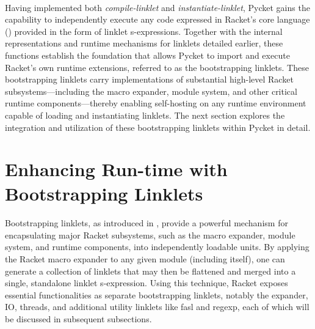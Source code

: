 		\paragraph{}%
			Having implemented both \emph{compile-linklet} and \emph{instantiate-linklet}, Pycket gains the capability to independently execute any code expressed in Racket's core language () provided in the form of linklet s-expressions. Together with the internal representations and runtime mechanisms for linklets detailed earlier, these functions establish the foundation that allows Pycket to import and execute Racket’s own runtime extensions, referred to as the bootstrapping linklets. These bootstrapping linklets carry implementations of substantial high-level Racket subsystems—including the macro expander, module system, and other critical runtime components—thereby enabling self-hosting on any runtime environment capable of loading and instantiating linklets. The next section explores the integration and utilization of these bootstrapping linklets within Pycket in detail.

	\section[\texorpdfstring{Enhancing Run-time with Bootstrapping Linklets}{Bootstrapping Linklets}]{Enhancing Run-time with Bootstrapping Linklets}

		\paragraph{}%
			Bootstrapping linklets, as introduced in , provide a powerful mechanism for encapsulating major Racket subsystems, such as the macro expander, module system, and runtime components, into independently loadable units. By applying the Racket macro expander to any given module (including itself), one can generate a collection of linklets that may then be flattened and merged into a single, standalone linklet s-expression. Using this technique, Racket exposes essential functionalities as separate bootstrapping linklets, notably the expander, IO, threads, and additional utility linklets like fasl and regexp, each of which will be discussed in subsequent subsections.

